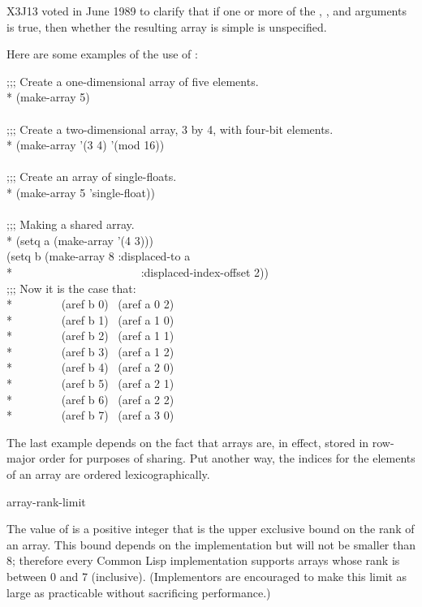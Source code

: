 \begin{defun}[Function]
\begin{newer}
X3J13 voted in June 1989
to clarify that if one or more of the , ,
and  arguments is true, then whether the resulting
array is simple is unspecified.
\end{newer}

Here are some examples of the use of :
\begin{lisp}
;;; Create a one-dimensional array of five elements. \\*
(make-array 5) \\
 \\
;;; Create a two-dimensional array, 3 by 4, with four-bit elements. \\*
(make-array '(3 4)  '(mod 16)) \\
 \\
;;; Create an array of single-floats.\\*
(make-array 5  'single-float)) \\
\\
;;; Making a shared array. \\*
(setq a (make-array '(4 3))) \\
(setq b (make-array 8 :displaced-to a \\*
~~~~~~~~~~~~~~~~~~~~~~:displaced-index-offset 2)) \\
;;; Now it is the case that: \\*
~~~~~~~~(aref b 0) \EQ\ (aref a 0 2) \\*
~~~~~~~~(aref b 1) \EQ\ (aref a 1 0) \\*
~~~~~~~~(aref b 2) \EQ\ (aref a 1 1) \\*
~~~~~~~~(aref b 3) \EQ\ (aref a 1 2) \\*
~~~~~~~~(aref b 4) \EQ\ (aref a 2 0) \\*
~~~~~~~~(aref b 5) \EQ\ (aref a 2 1) \\*
~~~~~~~~(aref b 6) \EQ\ (aref a 2 2) \\*
~~~~~~~~(aref b 7) \EQ\ (aref a 3 0)
\end{lisp}
The last example depends on the fact that arrays are, in effect,
stored in row-major order for purposes of sharing.  Put another way,
the indices for the elements of an array are ordered
lexicographically.
\end{defun}

\begin{defun}[Constant]
array-rank-limit

The value of  is a positive integer that is
the upper exclusive bound on the rank of an array.
This bound depends on the implementation
but will not be smaller than 8; therefore every Common Lisp implementation
supports arrays whose rank is between 0 and 7 (inclusive).
(Implementors are encouraged to make this limit as large as practicable
without sacrificing performance.)
\end{defun}

